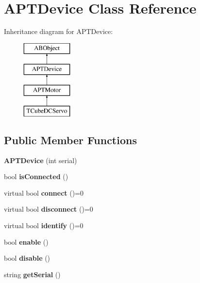 \hypertarget{class_a_p_t_device}{}\section{A\+P\+T\+Device Class Reference}
\label{class_a_p_t_device}
Inheritance diagram for A\+P\+T\+Device\+:\begin{figure}[H]
\begin{center}
\leavevmode
\includegraphics[height=4.000000cm]{class_a_p_t_device}
\end{center}
\end{figure}
\subsection*{Public Member Functions}
\begin{DoxyCompactItemize}
\item 
{\bfseries A\+P\+T\+Device} (int serial)\hypertarget{class_a_p_t_device_a689fd8cfcf7b00be3c3978977841ad16}{}\label{class_a_p_t_device_a689fd8cfcf7b00be3c3978977841ad16}

\item 
bool {\bfseries is\+Connected} ()\hypertarget{class_a_p_t_device_af79731bcc9de5e8c6cb4554c9c5ab728}{}\label{class_a_p_t_device_af79731bcc9de5e8c6cb4554c9c5ab728}

\item 
virtual bool {\bfseries connect} ()=0\hypertarget{class_a_p_t_device_a35a91d8e1989b65fafa10e4006b3efbb}{}\label{class_a_p_t_device_a35a91d8e1989b65fafa10e4006b3efbb}

\item 
virtual bool {\bfseries disconnect} ()=0\hypertarget{class_a_p_t_device_a538be58319f62fcb91bda97a16ce5850}{}\label{class_a_p_t_device_a538be58319f62fcb91bda97a16ce5850}

\item 
virtual bool {\bfseries identify} ()=0\hypertarget{class_a_p_t_device_a1f340e1712035518e60f0087c52c1ff0}{}\label{class_a_p_t_device_a1f340e1712035518e60f0087c52c1ff0}

\item 
bool {\bfseries enable} ()\hypertarget{class_a_p_t_device_a52c413688ce7be304ddfc3259c09e659}{}\label{class_a_p_t_device_a52c413688ce7be304ddfc3259c09e659}

\item 
bool {\bfseries disable} ()\hypertarget{class_a_p_t_device_a7b4fbb10d3ed7551b8c3328f654157ab}{}\label{class_a_p_t_device_a7b4fbb10d3ed7551b8c3328f654157ab}

\item 
string {\bfseries get\+Serial} ()\hypertarget{class_a_p_t_device_ad82cad5cb10407cde9940d634ae9d195}{}\label{class_a_p_t_device_ad82cad5cb10407cde9940d634ae9d195}

\end{DoxyCompactItemize}
